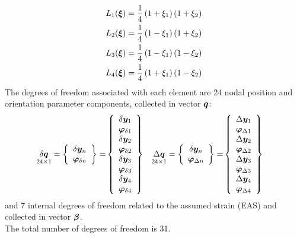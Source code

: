 \begin{subequations}
\begin{align}
L_1(\T{\xi}) & = \frac{1}{4} \plbr{ 1 + \xi_1 } \plbr{ 1 + \xi_2 } \\
L_2(\T{\xi}) & = \frac{1}{4} \plbr{ 1 - \xi_1 } \plbr{ 1 + \xi_2 } \\
L_3(\T{\xi}) & = \frac{1}{4} \plbr{ 1 - \xi_1 } \plbr{ 1 - \xi_2 } \\
L_4(\T{\xi}) & = \frac{1}{4} \plbr{ 1 + \xi_1 } \plbr{ 1 - \xi_2 }
\end{align}
\end{subequations}
The degrees of freedom associated with each element are 24 nodal position
and orientation parameter components, collected in vector ${\T{q}}$:
\begin{align}
\underset{24 \times 1}{\delta{\T{q}}}  =
\cubr{\vvect{c}{
\delta \T{y}_{n} \\
\T{\varphi}_{\delta n} \\
}}
 = &
\cubr{\vvect{c}{
\delta \T{y}_{1} \\
\T{\varphi}_{\delta 1} \\
\delta \T{y}_{2} \\
\T{\varphi}_{\delta 2} \\
\delta \T{y}_{3} \\
\T{\varphi}_{\delta 3} \\
\delta \T{y}_{4} \\
\T{\varphi}_{\delta 4} \\
}}
&
\underset{24 \times 1}{\Delta{\T{q}}}  =
\cubr{\vvect{c}{
\delta \T{y}_{n} \\
\T{\varphi}_{\Delta n} \\
}}
 = &
\cubr{\vvect{c}{
\Delta \T{y}_{1} \\
\T{\varphi}_{\Delta 1} \\
\Delta \T{y}_{2} \\
\T{\varphi}_{\Delta 2} \\
\Delta \T{y}_{3} \\
\T{\varphi}_{\Delta 3} \\
\Delta \T{y}_{4} \\
\T{\varphi}_{\Delta 4} \\
}}
\end{align}
and 7 internal degrees of freedom related to the assumed strain (EAS) and collected in vector $\T{\beta}$.\\
The total number of degrees of freedom is 31.
